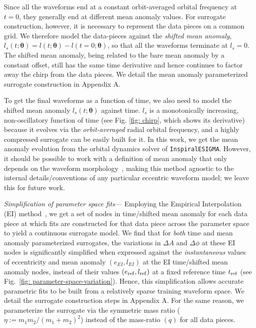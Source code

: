\documentclass[reprint, superscriptaddress, amsmath, amssymb, aps, prl floatfix]{revtex4-2}
\newcommand{\param}{\bm{\theta}}
\newcommand{\eref}{e_{\rm{ref}}}
\newcommand{\lref}{l_{\rm{ref}}}
\newcommand{\inspiralesigma}{\texttt{InspiralESIGMA}}
\begin{document}
Since all the waveforms end at a constant orbit-averaged orbital frequency at $t=0$, they generally end at different mean anomaly values. For surrogate construction, however, it is necessary to represent the data pieces on a common grid. We therefore model the data-pieces against the \textit{shifted mean anomaly}, $l_s(t; \param) = l(t; \param) - l(t=0; \param)$, so that all the waveforms terminate at $l_s=0$. The shifted mean anomaly, being related to the bare mean anomaly by a constant offset, still has the same time derivative and hence continues to factor away the chirp from the data pieces. We detail the mean anomaly parameterized surrogate construction in Appendix A. 

To get the final waveforms as a function of time, we also need to model the shifted mean anomaly $l_s(t; \param)$ against time. $l_s$ is a monotonically increasing, non-oscillatory function of time (see Fig. \ref{fig: chirp}, which shows its derivative) because it evolves via the \textit{orbit-averaged} radial orbital frequency, and a highly compressed surrogate can be easily built for it. In this work, we get the mean anomaly evolution from the orbital dynamics solver of \inspiralesigma{}. However, it should be possible to work with a definition of mean anomaly that only depends on the waveform morphology~\citep{Shaikh:2023ypz, Shaikh:2025tae}, making this method agnostic to the internal details/conventions of any particular eccentric waveform model; we leave this for future work.   


\textit{Simplification of parameter space fits---} Employing the Empirical Interpolation (EI) method~\citep{Field:2013cfa}, we get a set of nodes in time/shifted mean anomaly for each data piece at which fits are constructed for that data piece across the parameter space to yield a continuous surrogate model. We find that for \textit{both} time and mean anomaly parameterized surrogates, the variations in $\Delta A$ and $\Delta \phi$ at these EI nodes is significantly simplified when expressed against the \textit{instantaneous} values of eccentricity and mean anomaly $(e_{EI}, l_{EI})$ at the EI time/shifted mean anomaly nodes, instead of their values $(\eref, \lref)$ at a fixed reference time $t_{\rm{ref}}$ (see Fig.~\ref{fig: parameter-space-variation}). Hence, this simplification allows accurate parametric fits to be built from a relatively sparse training waveform space. We detail the surrogate construction steps in Appendix A. For the same reason, we parameterize the surrogate via the symmetric mass ratio ($\eta:=m_1 m_2/(m_1+m_2)^2$) instead of the mass-ratio $(q)$ for all data pieces.
\end{document}
